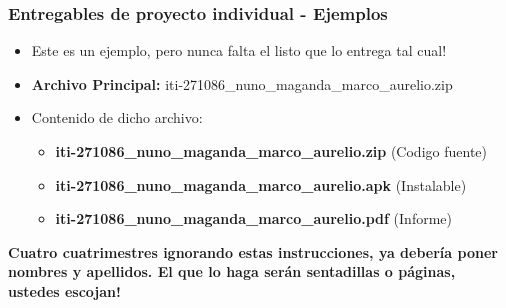 \begin{frame}
\frametitle{Entregables de proyecto individual - Ejemplos}
\begin{itemize}
\item Este es un ejemplo, pero nunca falta el listo que lo entrega tal cual!
\item \textbf{Archivo Principal:} iti-271086\_nuno\_maganda\_marco\_aurelio.zip
\item Contenido de dicho archivo:

\begin{itemize}
\item \textbf{iti-271086\_nuno\_maganda\_marco\_aurelio.zip} (Codigo fuente)
\item \textbf{iti-271086\_nuno\_maganda\_marco\_aurelio.apk} (Instalable)
\item \textbf{iti-271086\_nuno\_maganda\_marco\_aurelio.pdf} (Informe)
\end{itemize}

\end{itemize}

\textbf{Cuatro cuatrimestres ignorando estas instrucciones, ya deber\'ia poner nombres y apellidos. El que lo haga ser\'an sentadillas o p\'aginas, ustedes escojan!}

\end{frame}





